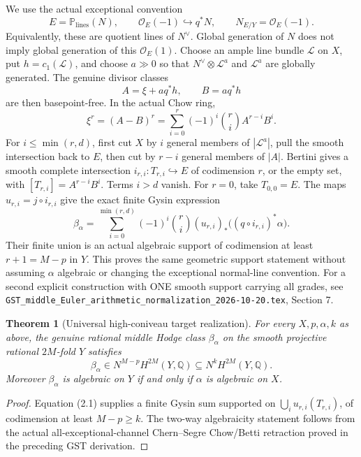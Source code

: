\documentclass[11pt]{article}
\newcommand{\Q}{\mathbb Q}
\newtheorem{theorem}{Theorem}[section]
\begin{document}
We use the actual exceptional convention
\[
 E=\mathbb P_{\mathrm{lines}}(N),\qquad
 \mathcal O_E(-1)\hookrightarrow q^*N,\qquad
 N_{E/Y}=\mathcal O_E(-1).
\]
Equivalently, these are quotient lines of \(N^\vee\).
Global generation of \(N\) does not imply global
generation of this \(\mathcal O_E(1)\).
Choose an ample line bundle \(\mathcal L\) on \(X\),
put \(h=c_1(\mathcal L)\), and choose \(a\gg0\)
so that \(N^\vee\otimes\mathcal L^a\) and
\(\mathcal L^a\) are globally generated.
The genuine divisor classes
\[
 A=\xi+a q^*h,\qquad B=a q^*h
\]
are then basepoint-free. In the actual Chow ring,
\[
 \xi^r=(A-B)^r
  =\sum_{i=0}^{r}(-1)^i{r\choose i}A^{r-i}B^i.
\]
For \(i\le\min(r,d)\), first cut \(X\) by \(i\)
general members of \(|\mathcal L^a|\), pull the
smooth intersection back to \(E\), then cut by
\(r-i\) general members of \(|A|\).
Bertini gives a smooth complete intersection
\(i_{r,i}:T_{r,i}\hookrightarrow E\) of codimension
\(r\), or the empty set, with
\([T_{r,i}]=A^{r-i}B^i\).
Terms \(i>d\) vanish. For \(r=0\), take \(T_{0,0}=E\).
The maps \(u_{r,i}=j\circ i_{r,i}\) give the exact
finite Gysin expression
\[
 \boxed{\beta_\alpha=
  \sum_{i=0}^{\min(r,d)}(-1)^i{r\choose i}
  (u_{r,i})_*\bigl((q\circ i_{r,i})^*\alpha\bigr).}
 \tag{2.1}
\]
Their finite union is an actual algebraic support of
codimension at least \(r+1=M-p\) in \(Y\).
This proves the same geometric support statement
without assuming \(\alpha\) algebraic or changing
the exceptional normal-line convention.
For a second explicit construction with ONE smooth
support carrying all grades, see
\texttt{GST\_middle\_Euler\_arithmetic\_normalization\_2026-10-20.tex},
Section 7.

\begin{theorem}[Universal high-coniveau target realization]
For every \(X,p,\alpha,k\) as above, the genuine rational
middle Hodge class \(\beta_\alpha\) on the smooth
projective rational \(2M\)-fold \(Y\) satisfies
\[
 \beta_\alpha\in N^{M-p}H^{2M}(Y,\Q)
    \subseteq N^kH^{2M}(Y,\Q).
 \tag{2.2}
\]
Moreover \(\beta_\alpha\) is algebraic on \(Y\)
if and only if \(\alpha\) is algebraic on \(X\).
\end{theorem}
\begin{proof}
Equation (2.1) supplies a finite Gysin sum supported
on \(\bigcup_i u_{r,i}(T_{r,i})\), of codimension
at least \(M-p\ge k\).
The two-way algebraicity statement follows from the
actual all-exceptional-channel Chern--Segre Chow/Betti
retraction proved in the preceding GST derivation.
\end{proof}
\end{document}
